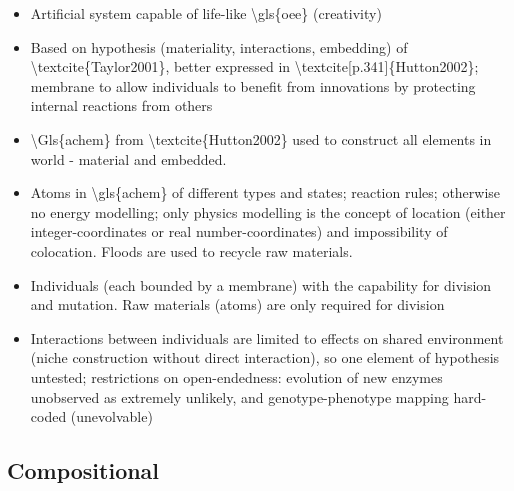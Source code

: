		\begin{itemize}
			\item
			
			Artificial system capable of life-like \textbackslash{}gls\{oee\}
			(creativity)
			
			\item
			
			Based on hypothesis (materiality, interactions, embedding) of
			\textbackslash{}textcite\{Taylor2001\}, better expressed in
			\textbackslash{}textcite{[}p.341{]}\{Hutton2002\}; membrane to allow
			individuals to benefit from innovations by protecting internal
			reactions from others
			
			\item
			
			\textbackslash{}Gls\{achem\} from
			\textbackslash{}textcite\{Hutton2002\} used to construct all elements
			in world - material and embedded.
			
			\item
			
			Atoms in \textbackslash{}gls\{achem\} of different types and states;
			reaction rules; otherwise no energy modelling; only physics modelling
			is the concept of location (either integer-coordinates or real
			number-coordinates) and impossibility of colocation. Floods are used
			to recycle raw materials.
			
			\item
			
			Individuals (each bounded by a membrane) with the capability for
			division and mutation. Raw materials (atoms) are only required for
			division
			
			\item
			
			Interactions between individuals are limited to effects on shared
			environment (niche construction without direct interaction), so one
			element of hypothesis untested; restrictions on open-endedness:
			evolution of new enzymes unobserved as extremely unlikely, and
			genotype-phenotype mapping hard-coded (unevolvable)
			
		\end{itemize}
		
	
\subsection{Compositional}
		
		\autocite{Vasas2015, Vasas2012, Vasas2012a}
		
